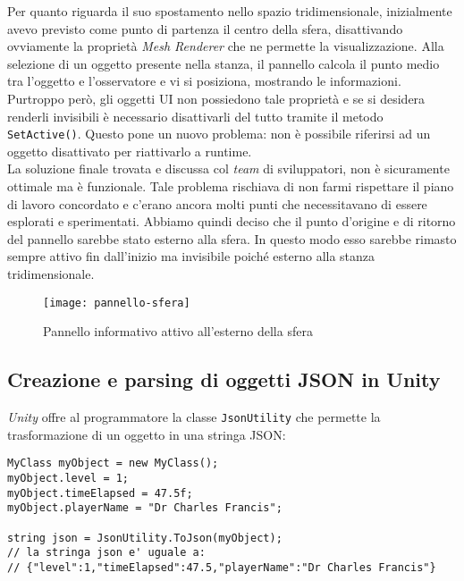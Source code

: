 Per quanto riguarda il suo spostamento nello spazio tridimensionale, inizialmente avevo previsto come punto di partenza il centro della sfera, disattivando ovviamente la proprietà \textit{Mesh Renderer} che ne permette la visualizzazione. Alla selezione di un oggetto presente nella stanza, il pannello calcola il punto medio tra l'oggetto e l'osservatore e vi si posiziona, mostrando le informazioni. Purtroppo però, gli oggetti UI non possiedono tale proprietà e se si desidera renderli invisibili è necessario disattivarli del tutto tramite il metodo \texttt{SetActive()}. Questo pone un nuovo problema: non è possibile riferirsi ad un oggetto disattivato per riattivarlo a runtime. \\
La soluzione finale trovata e discussa col \textit{team} di sviluppatori, non è sicuramente ottimale ma è funzionale. Tale problema rischiava di non farmi rispettare il piano di lavoro concordato e c'erano ancora molti punti che necessitavano di essere esplorati e sperimentati. Abbiamo quindi deciso che il punto d'origine e di ritorno del pannello sarebbe stato esterno alla sfera. In questo modo esso sarebbe rimasto sempre attivo fin dall'inizio ma invisibile poiché esterno alla stanza tridimensionale.

\label{Pannello sfera}
\begin{figure}[ht]
	\begin{center}
		\texttt{[image: pannello-sfera]}
		\caption{Pannello informativo attivo all'esterno della sfera}
	\end{center}
\end{figure}
\FloatBarrier 

\subsection{Creazione e parsing di oggetti JSON in Unity}

\textit{Unity} offre al programmatore la classe \texttt{JsonUtility} che permette la trasformazione di un oggetto in una stringa JSON:

\begin{lstlisting}[style=MyCStyle]
MyClass myObject = new MyClass();
myObject.level = 1;
myObject.timeElapsed = 47.5f;
myObject.playerName = "Dr Charles Francis";

string json = JsonUtility.ToJson(myObject);
// la stringa json e' uguale a: 
// {"level":1,"timeElapsed":47.5,"playerName":"Dr Charles Francis"}
\end{lstlisting}

